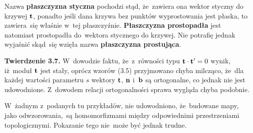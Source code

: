 \documentclass[a4paper,11pt]{article}
\begin{document}




\start {} Nazwa \textbf{płaszczyzna styczna} pochodzi stąd,
że~zawiera ona wektor styczny do krzywej $\mathbf{t}$, ponadto jeśli dana
krzywa bez punktów wyprostowania jest płaska, to zawiera~się właśnie
w~tej płaszczyźnie. \textbf{Płaszczyzna prostopadła} jest natomiast
prostopadła do~wektora stycznego do krzywej. Nie potrafię jednak
wyjaśnić skąd~się wzięła nazwa \textbf{płaszczyzna prostująca}.

\vspace{\spaceFour}





\start {} \textbf{Twierdzenie 3.7.} W~dowodzie faktu, że~z~równości
typu $\mathbf{t} \cdot \mathbf{t}' = 0$ wynik, iż~moduł $\mathbf{t}$ jest stały,
oprócz wzorów (3.5) przyjmowano chyba milcząco, że~dla każdej wartości
parametru $s$ wektory $\mathbf{t}$, $\mathbf{n}$ i~$\mathbf{b}$ są ortogonalne,
co jednak nie jest udowodnione. Z~dowodem relacji ortogonalności sprawa
wygląda chyba podobnie. \Dok

\vspace{\spaceFour}





\start {} W~żadnym z~podanych tu przykładów, nie udowodniono,
że~budowane mapy, jako odwzorowania,~są homomorfizmami między
odpowiednimi przestrzeniami topologicznymi. Pokazanie tego nie~może
być jednak trudne. \Dok

\vspace{\spaceFour}





\end{document}
